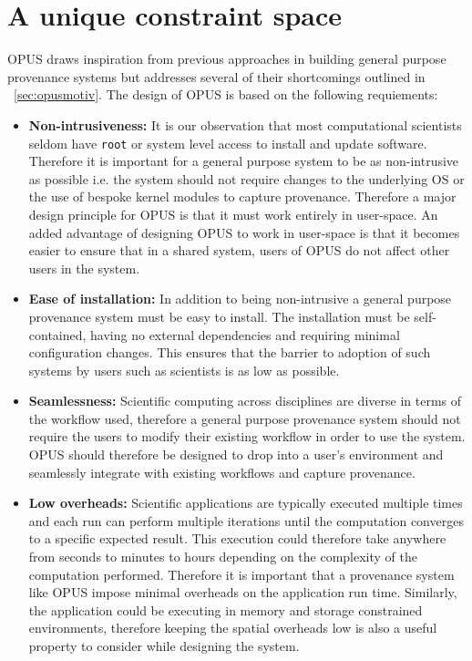 \documentclass[withindex,glossary]{cam-thesis}
\begin{document}
\section{A unique constraint space}
OPUS draws inspiration from previous approaches in building general purpose provenance systems but addresses several of their shortcomings outlined in ~\ref{sec:opusmotiv}. The design of OPUS is based on the following requiements:

\begin{itemize}

\item \textbf{Non-intrusiveness:}
It is our observation that most computational scientists seldom have \texttt{root} or system level access to install and update software. Therefore it is important for a general purpose system to be as non-intrusive as possible i.e. the system should not require changes to the underlying OS or the use of bespoke kernel modules to capture provenance. Therefore a major design principle for OPUS is that it must work entirely in user-space. An added advantage of designing OPUS to work in user-space is that it becomes easier to ensure that in a shared system, users of OPUS do not affect other users in the system.

\item \textbf{Ease of installation:}
In addition to being non-intrusive a general purpose provenance system must be easy to install. The installation must be self-contained, having no external dependencies and requiring minimal configuration changes. This ensures that the barrier to adoption of such systems by users such as scientists is as low as possible.

\item \textbf{Seamlessness:}
Scientific computing across disciplines are diverse in terms of the workflow used, therefore a general purpose provenance system should not require the users to modify their existing workflow in order to use the system. OPUS should therefore be designed to drop into a user's environment and seamlessly integrate with existing workflows and capture provenance.

\item \textbf{Low overheads:} 
Scientific applications are typically executed multiple times and each run can perform multiple iterations until the computation converges to a specific expected result. This execution could therefore take anywhere from seconds to minutes to hours depending on the complexity of the computation performed. Therefore it is important that a provenance system like OPUS impose minimal overheads on the application run time. Similarly, the application could be executing in memory and storage constrained environments, therefore keeping the spatial overheads low is also a useful property to consider while designing the system.


\end{itemize}
\end{document}
